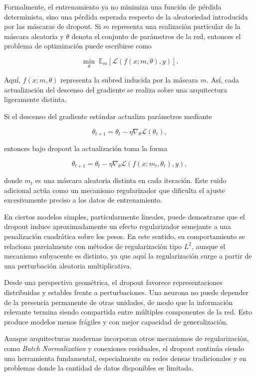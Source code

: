 \documentclass[
  spanish,
  us-letterpaper,
  DIV=11,
  numbers=noendperiod]{scrreprt}
\begin{document}
Formalmente, el entrenamiento ya no minimiza una función de pérdida
determinista, sino una pérdida esperada respecto de la aleatoriedad
introducida por las máscaras de dropout. Si \(m\) representa una
realización particular de la máscara aleatoria y \(\theta\) denota el
conjunto de parámetros de la red, entonces el problema de optimización
puede escribirse como

\[
\min_\theta
\;
\mathbb{E}_m
\left[
\mathcal{L}(f(x;m,\theta),y)
\right].
\]

Aquí, \(f(x;m,\theta)\) representa la subred inducida por la máscara
\(m\). Así, cada actualización del descenso del gradiente se realiza
sobre una arquitectura ligeramente distinta.

Si el descenso del gradiente estándar actualiza parámetros mediante

\[
\theta_{t+1}
=
\theta_t
-
\eta\nabla_\theta\mathcal{L}(\theta_t),
\]

entonces bajo dropout la actualización toma la forma

\[
\theta_{t+1}
=
\theta_t
-
\eta
\nabla_\theta
\mathcal{L}(f(x;m_t,\theta_t),y),
\]

donde \(m_t\) es una máscara aleatoria distinta en cada iteración. Este
ruido adicional actúa como un mecanismo regularizador que dificulta el
ajuste excesivamente preciso a los datos de entrenamiento.

En ciertos modelos simples, particularmente lineales, puede demostrarse
que el dropout induce aproximadamente un efecto regularizador semejante
a una penalización cuadrática sobre los pesos. En este sentido, su
comportamiento se relaciona parcialmente con métodos de regularización
tipo \(L^2\), aunque el mecanismo subyacente es distinto, ya que aquí la
regularización surge a partir de una perturbación aleatoria
multiplicativa.

Desde una perspectiva geométrica, el dropout favorece representaciones
distribuidas y estables frente a perturbaciones. Una neurona no puede
depender de la presencia permanente de otras unidades, de modo que la
información relevante termina siendo compartida entre múltiples
componentes de la red. Esto produce modelos menos frágiles y con mejor
capacidad de generalización.

Aunque arquitecturas modernas incorporan otros mecanismos de
regularización, como \emph{Batch Normalization} y conexiones residuales,
el dropout continúa siendo una herramienta fundamental, especialmente en
redes densas tradicionales y en problemas donde la cantidad de datos
disponibles es limitada.
\end{document}
